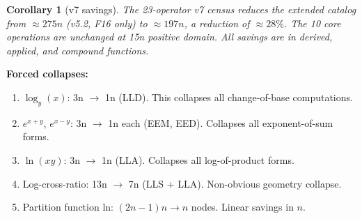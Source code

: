 \documentclass[11pt]{article}
\newtheorem{corollary}[theorem]{Corollary}
\begin{document}
\begin{corollary}[v7 savings]
The 23-operator v7 census reduces the extended catalog from $\approx 275n$ (v5.2, F16 only)
to $\approx 197n$, a reduction of $\approx 28\%$.
The 10 core operations are unchanged at 15n positive domain.
All savings are in derived, applied, and compound functions.
\end{corollary}

\noindent \textbf{Forced collapses:}
\begin{enumerate}
  \item $\log_y(x)$: 3n $\to$ 1n (LLD). This collapses all change-of-base computations.
  \item $e^{x+y}$, $e^{x-y}$: 3n $\to$ 1n each (EEM, EED). Collapses all exponent-of-sum forms.
  \item $\ln(xy)$: 3n $\to$ 1n (LLA). Collapses all log-of-product forms.
  \item Log-cross-ratio: 13n $\to$ 7n (LLS + LLA). Non-obvious geometry collapse.
  \item Partition function ln: $(2n-1)n \to n$ nodes. Linear savings in $n$.
\end{enumerate}
\end{document}
